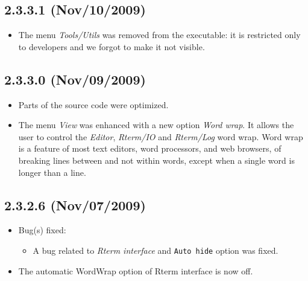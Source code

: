 \subsection*{2.3.3.1 (Nov/10/2009)}
\begin{itemize}
  \item The menu \textit{Tools/Utils} was removed from the executable:
    it is restricted only to developers and we forgot to make it not
    visible.
\end{itemize}


\subsection*{2.3.3.0 (Nov/09/2009)}
\begin{itemize}
  \item Parts of the source code were optimized.
  \item The menu \textit{View} was enhanced with a new option \textit{Word wrap}.
    It allows the user to control the \textit{Editor}, \textit{Rterm/IO} and
    \textit{Rterm/Log} word wrap. Word wrap is a feature of most text editors,
    word processors, and web browsers, of breaking lines between and not within
    words, except when a single word is longer than a line.
\end{itemize}


\subsection*{2.3.2.6 (Nov/07/2009)}
\begin{itemize}
  \item Bug(s) fixed:
    \begin{itemize}
      \item A bug related to \textit{Rterm interface} and \texttt{Auto hide} option
        was fixed.
    \end{itemize}
  \item The automatic WordWrap option of Rterm interface is now off.
\end{itemize}


